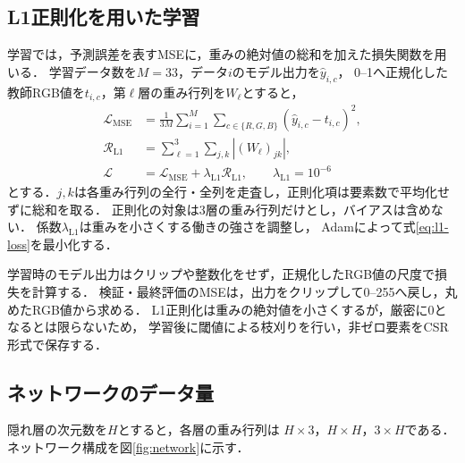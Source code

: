 \documentclass[a4paper,11pt]{article}
\begin{document}
\Needspace{95mm}
\subsection{L1正則化を用いた学習}

学習では，予測誤差を表すMSEに，重みの絶対値の総和を加えた損失関数を用いる．
学習データ数を$M=33$，データ$i$のモデル出力を$\widehat{y}_{i,c}$，
0--1へ正規化した教師RGB値を$t_{i,c}$，第$\ell$層の重み行列を$W_\ell$とすると，
\begin{align}
  \mathcal{L}_{\mathrm{MSE}}
    &=\frac{1}{3M}\sum_{i=1}^{M}\sum_{c\in\{R,G,B\}}
      (\widehat{y}_{i,c}-t_{i,c})^2,\label{eq:training-mse}\\
  \mathcal{R}_{\mathrm{L1}}
    &=\sum_{\ell=1}^{3}\sum_{j,k}|(W_\ell)_{jk}|,\label{eq:l1-penalty}\\
  \mathcal{L}
    &=\mathcal{L}_{\mathrm{MSE}}+\lambda_{\mathrm{L1}}\mathcal{R}_{\mathrm{L1}},
      \qquad\lambda_{\mathrm{L1}}=10^{-6}\label{eq:l1-loss}
\end{align}
とする．$j,k$は各重み行列の全行・全列を走査し，正則化項は要素数で平均化せずに総和を取る．
正則化の対象は3層の重み行列だけとし，バイアスは含めない．
係数$\lambda_{\mathrm{L1}}$は重みを小さくする働きの強さを調整し，
Adamによって式\eqref{eq:l1-loss}を最小化する．

学習時のモデル出力はクリップや整数化をせず，正規化したRGB値の尺度で損失を計算する．
検証・最終評価のMSEは，出力をクリップして0--255へ戻し，丸めたRGB値から求める．
L1正則化は重みの絶対値を小さくするが，厳密に0となるとは限らないため，
学習後に閾値による枝刈りを行い，非ゼロ要素をCSR形式で保存する．

\subsection{ネットワークのデータ量}

隠れ層の次元数を$H$とすると，各層の重み行列は
$H\times 3$，$H\times H$，$3\times H$である．ネットワーク構成を図\ref{fig:network}に示す．
\end{document}
